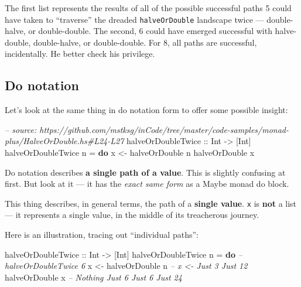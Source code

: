 \documentclass[]{article}
\newenvironment{Shaded}{\begin{snugshade}}{\end{snugshade}}
\newcommand{\CommentTok}[1]{\textcolor[rgb]{0.56,0.35,0.01}{\textit{#1}}}
\newcommand{\DataTypeTok}[1]{\textcolor[rgb]{0.13,0.29,0.53}{#1}}
\newcommand{\FunctionTok}[1]{\textcolor[rgb]{0.00,0.00,0.00}{#1}}
\newcommand{\KeywordTok}[1]{\textcolor[rgb]{0.13,0.29,0.53}{\textbf{#1}}}
\newcommand{\NormalTok}[1]{#1}
\newcommand{\OtherTok}[1]{\textcolor[rgb]{0.56,0.35,0.01}{#1}}
\begin{document}
The first list represents the results of all of the possible successful paths 5
could have taken to ``traverse'' the dreaded \texttt{halveOrDouble} landscape
twice --- double-halve, or double-double. The second, 6 could have emerged
successful with halve-double, double-halve, or double-double. For 8, all paths
are successful, incidentally. He better check his privilege.

\hypertarget{do-notation}{%
\subsection{Do notation}\label{do-notation}}

Let's look at the same thing in do notation form to offer some possible insight:

\begin{Shaded}
\begin{Highlighting}[]
\CommentTok{-- source: https://github.com/mstksg/inCode/tree/master/code-samples/monad-plus/HalveOrDouble.hs#L24-L27}
\OtherTok{halveOrDoubleTwice ::} \DataTypeTok{Int} \OtherTok{->}\NormalTok{ [}\DataTypeTok{Int}\NormalTok{]}
\NormalTok{halveOrDoubleTwice n }\FunctionTok{=} \KeywordTok{do}
\NormalTok{    x }\OtherTok{<-}\NormalTok{ halveOrDouble n}
\NormalTok{    halveOrDouble x}
\end{Highlighting}
\end{Shaded}

Do notation describes \textbf{a single path of a value}. This is slightly
confusing at first. But look at it --- it has the \emph{exact same form} as a
Maybe monad do block.

This thing describes, in general terms, the path of a \textbf{single value}.
\texttt{x} is \textbf{not} a list --- it represents a single value, in the
middle of its treacherous journey.

Here is an illustration, tracing out ``individual paths'':

\begin{Shaded}
\begin{Highlighting}[]
\OtherTok{halveOrDoubleTwice ::} \DataTypeTok{Int} \OtherTok{->}\NormalTok{ [}\DataTypeTok{Int}\NormalTok{]}
\NormalTok{halveOrDoubleTwice n }\FunctionTok{=} \KeywordTok{do}       \CommentTok{-- halveOrDoubleTwice 6}
\NormalTok{    x }\OtherTok{<-}\NormalTok{ halveOrDouble n        }\CommentTok{-- x <-     Just 3          Just 12}
\NormalTok{    halveOrDouble x             }\CommentTok{--      Nothing  Just 6  Just 6  Just 24}
\end{Highlighting}
\end{Shaded}
\end{document}
